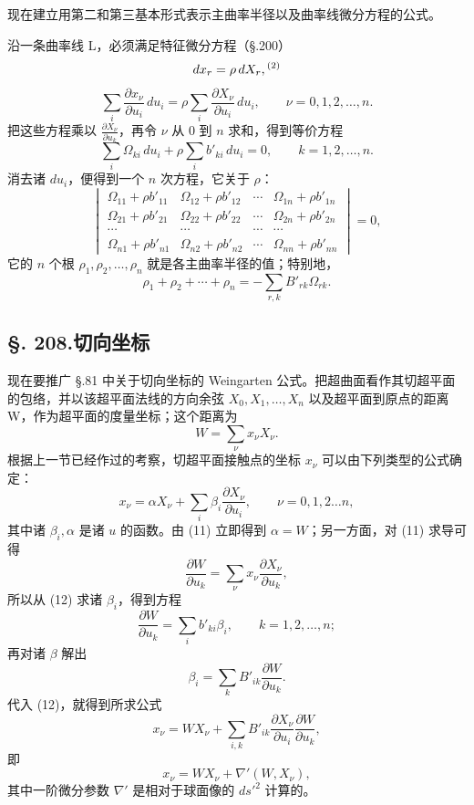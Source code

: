 现在建立用第二和第三基本形式表示主曲率半径以及曲率线微分方程的公式。

沿一条曲率线 L，必须满足特征微分方程（\S.200）
\[
dx_r=\rho\,dX_r,\srcfnmark{2}
\]
\[
\sum_i\frac{\partial x_\nu}{\partial u_i}\,du_i
=\rho\sum_i\frac{\partial X_\nu}{\partial u_i}\,du_i,\qquad
\nu=0,1,2,\ldots,n.
\]
把这些方程乘以 $\frac{\partial X_\nu}{\partial u_k}$，再令 $\nu$ 从 0 到 $n$ 求和，得到等价方程
\[
\tag{8}
\sum_i\Omega_{ki}\,du_i+\rho\sum_i b'_{ki}\,du_i=0,\qquad
k=1,2,\ldots,n.
\]
消去诸 $du_i$，便得到一个 $n$ 次方程，它关于 $\rho$：
\[
\tag{9}
\begin{vmatrix}
\Omega_{11}+\rho b'_{11}&\Omega_{12}+\rho b'_{12}&\cdots&\Omega_{1n}+\rho b'_{1n}\\
\Omega_{21}+\rho b'_{21}&\Omega_{22}+\rho b'_{22}&\cdots&\Omega_{2n}+\rho b'_{2n}\\
\cdots&\cdots&\cdots&\cdots\\
\Omega_{n1}+\rho b'_{n1}&\Omega_{n2}+\rho b'_{n2}&\cdots&\Omega_{nn}+\rho b'_{nn}
\end{vmatrix}=0,
\]
它的 $n$ 个根 $\rho_1,\rho_2,\ldots,\rho_n$ 就是各主曲率半径的值；特别地，
\[
\tag{10}
\rho_1+\rho_2+\cdots+\rho_n=-\sum_{r,k}B'_{rk}\Omega_{rk}.
\]

\subsection*{\S. 208.\quad 切向坐标}

现在要推广 \S.81 中关于切向坐标的 Weingarten 公式。把超曲面看作其切超平面的包络，并以该超平面法线的方向余弦 $X_0,X_1,\ldots,X_n$ 以及超平面到原点的距离 W，作为超平面的度量坐标；这个距离为
\[
\tag{11}
W=\sum_\nu x_\nu X_\nu.
\]
根据上一节已经作过的考察，切超平面接触点的坐标 $x_\nu$ 可以由下列类型的公式确定：
\[
\tag{12}
x_\nu=\alpha X_\nu+\sum_i\beta_i\frac{\partial X_\nu}{\partial u_i},
\qquad \nu=0,1,2\ldots n,
\]
其中诸 $\beta_i,\alpha$ 是诸 $u$ 的函数。由 (11) 立即得到 $\alpha=W$；另一方面，对 (11) 求导可得
\[
\tag{13}
\frac{\partial W}{\partial u_k}
=\sum_\nu x_\nu\frac{\partial X_\nu}{\partial u_k},
\]
所以从 (12) 求诸 $\beta_i$，得到方程
\[
\frac{\partial W}{\partial u_k}=\sum_i b'_{ki}\beta_i,\qquad k=1,2,\ldots,n;
\]
再对诸 $\beta$ 解出
\[
\beta_i=\sum_k B'_{ik}\frac{\partial W}{\partial u_k}.
\]
代入 (12)，就得到所求公式
\[
x_\nu=WX_\nu+\sum_{i,k}B'_{ik}
\frac{\partial X_\nu}{\partial u_i}\frac{\partial W}{\partial u_k},
\]
即
\[
\tag{V}
x_\nu=WX_\nu+\nabla'(W,X_\nu),
\]
其中一阶微分参数 $\nabla'$ 是相对于球面像的 $ds'^2$ 计算的。

